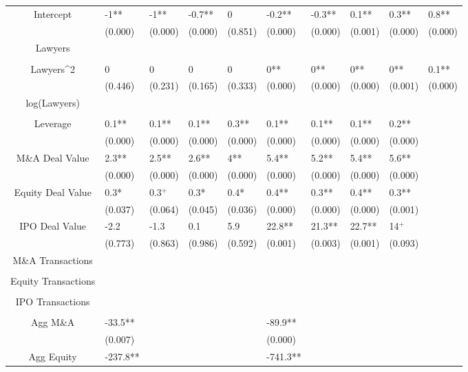 \documentclass{article}
\begin{document}
\begin{table}[H]
\begin{tabular}{|clllllllll|}
Intercept & -1** & -1** & -0.7** & 0 & -0.2** & -0.3** & 0.1** & 0.3** & 0.8** \\ 
   & (0.000) & (0.000) & (0.000) & (0.851) & (0.000) & (0.000) & (0.001) & (0.000) & (0.000) \\ 
  Lawyers &  &  &  &  &  &  &  &  &  \\ 
   &  &  &  &  &  &  &  &  &  \\ 
  Lawyers^2 & 0 & 0 & 0 & 0 & 0** & 0** & 0** & 0** & 0.1** \\ 
   & (0.446) & (0.231) & (0.165) & (0.333) & (0.000) & (0.000) & (0.000) & (0.001) & (0.000) \\ 
  log(Lawyers) &  &  &  &  &  &  &  &  &  \\ 
   &  &  &  &  &  &  &  &  &  \\ 
  Leverage & 0.1** & 0.1** & 0.1** & 0.3** & 0.1** & 0.1** & 0.1** & 0.2** &  \\ 
   & (0.000) & (0.000) & (0.000) & (0.000) & (0.000) & (0.000) & (0.000) & (0.000) &  \\ 
  M\&A Deal Value & 2.3** & 2.5** & 2.6** & 4** & 5.4** & 5.2** & 5.4** & 5.6** &  \\ 
   & (0.000) & (0.000) & (0.000) & (0.000) & (0.000) & (0.000) & (0.000) & (0.000) &  \\ 
  Equity Deal Value & 0.3* & 0.3$^{+}$ & 0.3* & 0.4* & 0.4** & 0.3** & 0.4** & 0.3** &  \\ 
   & (0.037) & (0.064) & (0.045) & (0.036) & (0.000) & (0.000) & (0.000) & (0.001) &  \\ 
  IPO Deal Value & -2.2 & -1.3 & 0.1 & 5.9 & 22.8** & 21.3** & 22.7** & 14$^{+}$ &  \\ 
   & (0.773) & (0.863) & (0.986) & (0.592) & (0.001) & (0.003) & (0.001) & (0.093) &  \\ 
  M\&A Transactions &  &  &  &  &  &  &  &  &  \\ 
   &  &  &  &  &  &  &  &  &  \\ 
  Equity Transactions &  &  &  &  &  &  &  &  &  \\ 
   &  &  &  &  &  &  &  &  &  \\ 
  IPO Transactions &  &  &  &  &  &  &  &  &  \\ 
   &  &  &  &  &  &  &  &  &  \\ 
  Agg M\&A & -33.5** &  &  &  & -89.9** &  &  &  &  \\ 
   & (0.007) &  &  &  & (0.000) &  &  &  &  \\ 
  Agg Equity & -237.8** &  &  &  & -741.3** &  &  &  &  \\ 

\end{tabular}
\end{table}
\end{document}
